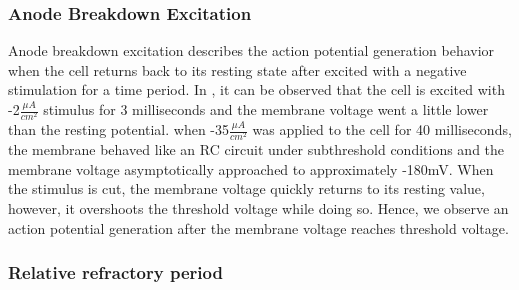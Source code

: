 \documentclass{IEEEtran}
\begin{document}
\subsubsection{Anode Breakdown Excitation}
Anode breakdown excitation describes the action potential generation behavior when the cell returns back to its resting state after excited with a negative stimulation for a time period. In , it can be observed that the cell is excited with -2$\frac{\mu A}{cm^2}$ stimulus for 3 milliseconds and the membrane voltage went a little lower than the resting potential. when -35$\frac{\mu A}{cm^2}$ was applied to the cell for 40 milliseconds, the membrane behaved like an RC circuit under subthreshold conditions and the membrane voltage asymptotically approached to approximately -180mV. When the stimulus is cut, the membrane voltage quickly returns to its resting value, however, it overshoots the threshold voltage while doing so. Hence, we observe an action potential generation after the membrane voltage reaches threshold voltage. 
\subsubsection{Relative refractory period}
\clearpage
\printbibliography{}
\end{document}
